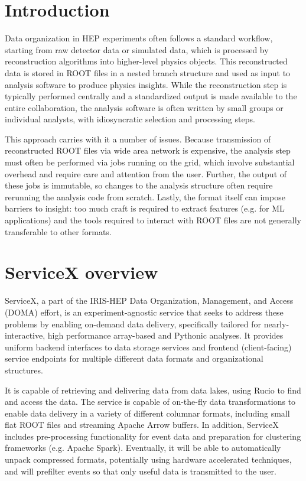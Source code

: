 \documentclass{webofc}
\begin{document}
\section{Introduction}
\label{sec:intro}
Data organization in HEP experiments often follows a standard workflow, starting from raw detector
data or simulated data, which is processed by reconstruction algorithms into higher-level physics
objects. This reconstructed data is stored in ROOT files in a nested branch structure and used as
input to analysis software to produce physics insights. While the reconstruction step is typically
performed centrally and a standardized output is made available to the entire collaboration, the
analysis software is often written by small groups or individual analysts, with idiosyncratic
selection and processing steps.

This approach carries with it a number of issues. Because transmission of reconstructed ROOT files
via wide area network is expensive, the analysis step must often be performed via jobs running on
the grid, which involve substantial overhead and require care and attention from the user. Further,
the output of these jobs is immutable, so changes to the analysis structure often require rerunning
the analysis code from scratch. Lastly, the format itself can impose barriers to insight: too much
craft is required to extract features (e.g. for ML applications) and the tools required to interact
with ROOT files are not generally transferable to other formats.

\section{ServiceX overview}
\label{sec:overview}

ServiceX, a part of the IRIS-HEP Data Organization, Management, and Access (DOMA) effort, is an
experiment-agnostic service that seeks to address these problems by enabling on-demand data
delivery, specifically tailored for nearly-interactive, high performance array-based and Pythonic
analyses. It provides uniform backend interfaces to data storage services and frontend
(client-facing) service endpoints for multiple different data formats and organizational
structures.

It is capable of retrieving and delivering data from data lakes, using Rucio to find and access the
data. The service is capable of on-the-fly data transformations to enable data delivery in a
variety of different columnar formats, including small flat ROOT files and streaming Apache Arrow
buffers. In addition, ServiceX includes pre-processing functionality for event data and preparation
for clustering frameworks (e.g. Apache Spark). Eventually, it will be able to automatically unpack
compressed formats, potentially using hardware accelerated techniques, and will prefilter events so
that only useful data is transmitted to the user.
\end{document}
